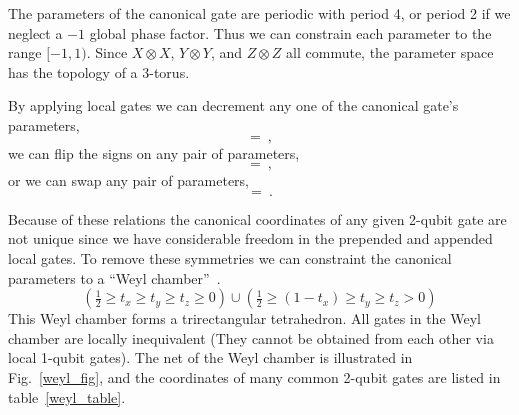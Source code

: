 The parameters of the canonical gate are periodic with period 4, or period 2 if we neglect a $-1$ global phase factor. Thus we can constrain each parameter to the range $[-1,1)$. Since $X\otimes X$,  $Y\otimes Y$, and $Z \otimes Z$ all commute, the parameter space has the topology of a 3-torus.
%


\begin{center}
\end{center}

By applying local gates we can decrement any one of the canonical gate's parameters,
$$

=
 \ ,
$$
we can flip the signs on any pair of parameters,
$$

=
 \ ,
$$
or we can swap any pair of parameters,
$$

= 
 \ .
$$

Because of these relations the canonical coordinates of any given 2-qubit gate are not unique since we have considerable freedom in the prepended and appended local gates. To remove these symmetries we can constraint the canonical parameters to a ``Weyl chamber''~\cite{???,???}. 
\begin{equation}
(\tfrac{1}{2} \ge  t_x \ge t_y \ge t_z \ge 0) \cup (\tfrac{1}{2} \ge (1-t_x) \ge t_y \ge t_z > 0 )
\label{WeylChamber}
\end{equation}
This Weyl chamber forms a  trirectangular tetrahedron.  All gates in the Weyl chamber are locally inequivalent (They cannot be obtained from each other via local 1-qubit gates). The net of the Weyl chamber is illustrated in Fig.~\ref{weyl_fig}, and the coordinates of many common 2-qubit gates are listed in table~\ref{weyl_table}. 

